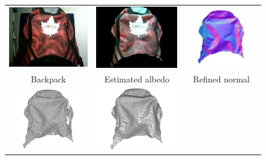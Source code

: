 \begin{figure}[!ht]
\centering
\setlength{\tabcolsep}{0.2em} %
 {\renewcommand{\arraystretch}{0.9}%
\begin{tabular}{c| c c}
   \includegraphics[height = 0.25\linewidth]{figures/methodology/robust_backpack_rgb.pdf}&
   \includegraphics[height = 0.25\linewidth]{figures/methodology/robust_backpack_rho.pdf} &
   \includegraphics[height = 0.25\linewidth]{figures/methodology/robust_backpack_normal.pdf} \\
   {Backpack} & {Estimated albedo} & {Refined normal}\\
   \includegraphics[height = 0.25\linewidth]{figures/methodology/robust_backpack_shape_init.pdf}&
   \includegraphics[height = 0.25\linewidth]{figures/methodology/robust_backpack_shape_smooth.pdf}&

\end{tabular}}
\end{figure}
